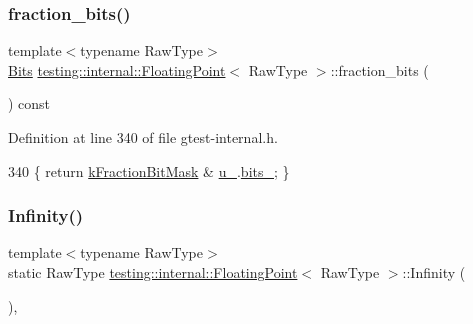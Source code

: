 \subsubsection{\texorpdfstring{fraction\+\_\+bits()}{fraction\_bits()}}
{\footnotesize\ttfamily template$<$typename Raw\+Type$>$ \\
\hyperlink{classtesting_1_1internal_1_1FloatingPoint_abf228bf6cd48f12c8b44c85b4971a731}{Bits} \hyperlink{classtesting_1_1internal_1_1FloatingPoint}{testing\+::internal\+::\+Floating\+Point}$<$ Raw\+Type $>$\+::fraction\+\_\+bits (\begin{DoxyParamCaption}{ }\end{DoxyParamCaption}) const\hspace{0.3cm}{\ttfamily [inline]}}



Definition at line 340 of file gtest-\/internal.\+h.


\begin{DoxyCode}
340 \{ \textcolor{keywordflow}{return} \hyperlink{classtesting_1_1internal_1_1FloatingPoint_a0ac75d4ffd24f14bca452abe8a718da1}{kFractionBitMask} & \hyperlink{classtesting_1_1internal_1_1FloatingPoint_a2e0b6bd427248b91476f3fca281f7104}{u\_}.\hyperlink{uniontesting_1_1internal_1_1FloatingPoint_1_1FloatingPointUnion_aedb69e386f5d624a016f7a781302a2bf}{bits\_}; \}
\end{DoxyCode}
\mbox{\label{classtesting_1_1internal_1_1FloatingPoint_a460027cc19cf01ae8e09cc3796b2b575}} 
\subsubsection{\texorpdfstring{Infinity()}{Infinity()}}
{\footnotesize\ttfamily template$<$typename Raw\+Type$>$ \\
static Raw\+Type \hyperlink{classtesting_1_1internal_1_1FloatingPoint}{testing\+::internal\+::\+Floating\+Point}$<$ Raw\+Type $>$\+::Infinity (\begin{DoxyParamCaption}{ }\end{DoxyParamCaption})\hspace{0.3cm}{\ttfamily [inline]}, {\ttfamily [static]}}




